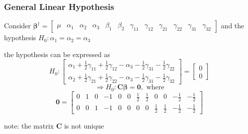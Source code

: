 \documentclass{article}
\begin{document}
\bigskip

\bigskip

\subsubsection{General Linear Hypothesis}

Consider $\mathbf{\beta }^{\dagger }=\left[ 
\begin{array}{cccccccccccc}
\mu & \alpha _{1} & \alpha _{2} & \alpha _{3} & \beta _{1} & \beta _{2} & 
\gamma _{11} & \gamma _{12} & \gamma _{21} & \gamma _{22} & \gamma _{31} & 
\gamma _{32}%
\end{array}%
\right] $ and the hypothesis $H_{0}:\alpha _{1}=\alpha _{2}=\alpha _{3}$

\bigskip

the hypothesis can be expressed as%
\begin{equation*}
H_{0}:\left[ 
\begin{array}{c}
\alpha _{1}+\frac{1}{2}\gamma _{11}+\frac{1}{2}\gamma _{12}-\alpha _{3}-%
\frac{1}{2}\gamma _{31}-\frac{1}{2}\gamma _{22} \\ 
\alpha _{2}+\frac{1}{2}\gamma _{21}+\frac{1}{2}\gamma _{22}-\alpha _{3}-%
\frac{1}{2}\gamma _{31}-\frac{1}{2}\gamma _{32}%
\end{array}%
\right] =\left[ 
\begin{array}{c}
0 \\ 
0%
\end{array}%
\right]
\end{equation*}%
\begin{equation*}
\Rightarrow H_{0}:\mathbf{C\beta =0},\text{ where}
\end{equation*}%
\begin{equation*}
\mathbf{0}=\left[ 
\begin{array}{cccccccccccc}
0 & 1 & 0 & -1 & 0 & 0 & \frac{1}{2} & \frac{1}{2} & 0 & 0 & -\frac{1}{2} & -%
\frac{1}{2} \\ 
0 & 0 & 1 & -1 & 0 & 0 & 0 & 0 & \frac{1}{2} & \frac{1}{2} & -\frac{1}{2} & -%
\frac{1}{2}%
\end{array}%
\right]
\end{equation*}

note: the matrix $\mathbf{C}$ is not unique

\bigskip
\end{document}
